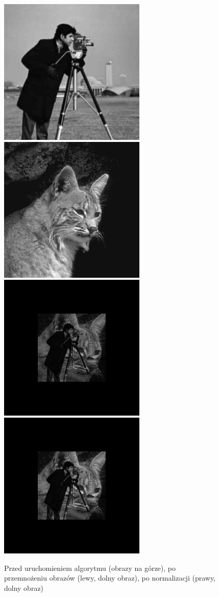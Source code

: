 \documentclass[a4paper,12pt]{book}
\begin{document}
\begin{figure}[H]
	\caption{Przed uruchomieniem algorytmu (obrazy na górze), po przemnożeniu obrazów (lewy, dolny obraz), po normalizacji (prawy, dolny obraz)}
	\includegraphics[width=7cm, height=7cm]{man-unmodified.jpg}
	\includegraphics[width=7cm, height=7cm]{cat-unmodified.jpg}
	\includegraphics[width=7cm, height=7cm]{2/multiply-gray-images.png}
	\includegraphics[width=7cm, height=7cm]{2/multiply-gray-images-norm.png}
\end{figure}
\end{document}
